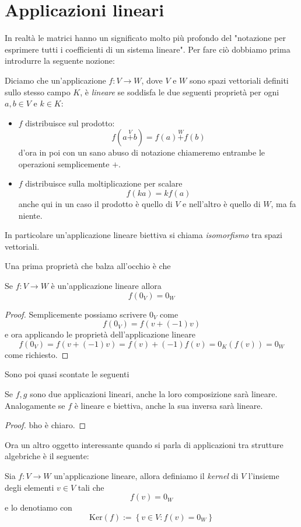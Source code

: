 \documentclass[11pt]{scrartcl}
\renewcommand{\ker}[1]{\text{Ker}\left(#1\right)}
\begin{document}
 	\section{Applicazioni lineari}
 	In realtà le matrici hanno un significato molto più profondo del "notazione per esprimere tutti i coefficienti di un sistema lineare". Per fare ciò dobbiamo prima introdurre la seguente nozione:
 	\begin{definition}
 		Diciamo che un'applicazione $f:V\to W$, dove $V$ e $W$ sono spazi vettoriali definiti sullo stesso campo $K$, è \textit{lineare} se soddisfa le due seguenti proprietà per ogni $a,b\in V$ e $k\in K$:
 		\begin{itemize}
 			\item $f$ distribuisce sul prodotto: $$f(a\overset{V}{+}b)=f(a)\overset{W}{+}f(b)$$ d'ora in poi con un sano abuso di notazione chiameremo entrambe le operazioni semplicemente $+$.
 			\item $f$ distribuisce sulla moltiplicazione per scalare
 			$$f(ka)=kf(a)$$
 			anche qui in un caso il prodotto è quello di $V$ e nell'altro è quello di $W$, ma fa niente. 
 		\end{itemize}
 		In particolare un'applicazione lineare biettiva si chiama \textit{isomorfismo} tra spazi vettoriali.
 	\end{definition}
 	 Una prima proprietà che balza all'occhio è che 
 	 \begin{lemma}
 	 	Se $f:V\to W$ è un'applicazione lineare allora
 	 	$$f(0_V)=0_W$$
 	 \end{lemma}
 	 \begin{proof}
 	 	Semplicemente possiamo scrivere $0_V$ come
 	 	$$f(0_V)=f(v+(-1)v)$$
 	 	e ora applicando le proprietà dell'applicazione lineare
 	 	$$f(0_V)=f(v+(-1)v)=f(v)+(-1)f(v)=0_K(f(v))=0_W$$
 	 	come richiesto.
 	 \end{proof}
 	 Sono poi quasi scontate le seguenti
 	 \begin{lemma}
 	 	Se $f,g$ sono due applicazioni lineari, anche la loro composizione sarà lineare. Analogamente se $f$ è lineare e biettiva, anche la sua inversa sarà lineare.
 	 \end{lemma}
 	 \begin{proof}
 	 	bho è chiaro.
 	 \end{proof}
 	 Ora un altro oggetto interessante quando si parla di applicazioni tra strutture algebriche è il seguente:
 	 \begin{definition}
 	 	Sia $f:V\to W$ un'applicazione lineare, allora definiamo il \textit{kernel} di $V$ l'insieme degli elementi $v\in V$ tali che
 	 	$$f(v)=0_W$$
 	 	e lo denotiamo con 
 	 	$$\ker{f} := \left\{v\in V: f(v)=0_W\right\}$$
 	 \end{definition}
\end{document}
